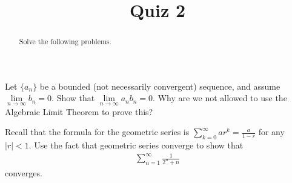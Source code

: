 \documentclass{ximera}
\begin{document}
    \title{Quiz 2}
    \begin{abstract} Solve the following problems. \end{abstract}
    \maketitle

\begin{exercise}
Let $\{a_n\}$ be a bounded (not necessarily convergent) sequence, and assume $\lim\limits_{n\to \infty} b_n = 0$.  Show that $\lim\limits_{n\to\infty} a_nb_n=0$.  Why are we not allowed to use the Algebraic Limit Theorem to prove this? 
\end{exercise}
\newpage
\begin{exercise}
Recall that the formula for the geometric series is $\sum\limits_{k=0}^\infty ar^k= \frac{a}{1-r}$ for any $|r| < 1$.  Use the fact that geometric series converge to show that 
\begin{align*}
    \sum\limits_{n=1}^\infty \frac{1}{2^n + n}
\end{align*}
converges.
\end{exercise}
\end{document}
